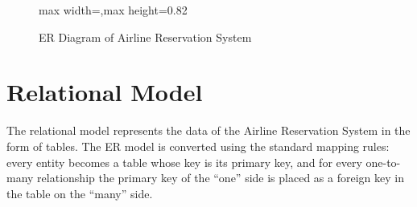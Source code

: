 \documentclass[12pt,a4paper]{article}
\begin{document}
\begin{landscape}
\begin{figure}[p]
\begin{adjustbox}{max width=\linewidth,max height=0.82\textheight}
\end{adjustbox}
\caption{ER Diagram of Airline Reservation System}
\end{figure}
\end{landscape}

\section{Relational Model}
The relational model represents the data of the Airline Reservation System in the form of tables. The ER
model is converted using the standard mapping rules: every entity becomes a table whose key is its primary
key, and for every one-to-many relationship the primary key of the ``one'' side is placed as a foreign key
in the table on the ``many'' side.
\end{document}
